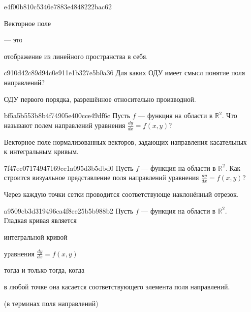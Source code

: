 \begin{note}{e4f00b810c5346e7883e4848222bac62}
    \begin{icloze}{2}Векторное поле\end{icloze} --- это \begin{icloze}{1}отображение из линейного пространства в себя.\end{icloze}
\end{note}

\begin{note}{c910d42c89d94c0e911e1b327e5b0a36}
    Для каких ОДУ имеет смысл понятие поля направлений?

    \begin{cloze}{1}
        ОДУ первого порядка, разрешённое относительно производной.
    \end{cloze}
\end{note}

\begin{note}{bf5a5b553b8b4f74905e400cce49df6c}
    Пусть \({ f }\) --- функция на области в \({ \mathbb R^2 }\).
    Что называют полем направлений уравнения \({ \frac{dy}{dx} = f(x, y) }\)?

    \begin{cloze}{1}
        Векторное поле нормализованных векторов, задающих направления касательных к интегральным кривым.
    \end{cloze}
\end{note}

\begin{note}{7f47ec07174947169cc1a095d3b5dbd0}
    Пусть \({ f }\) --- функция на области в \({ \mathbb R^2 }\).
    Как строится визуальное представление поля направлений уравнения \({ \frac{dy}{dx} = f(x, y) }\)?

    \begin{cloze}{1}
        Через каждую точки сетки проводится соответствующе наклонённый отрезок.
    \end{cloze}
\end{note}

\begin{note}{a9509cb3d319496ca4f8ce25b5b988b2}
    Пусть \({ f }\) --- функция на области в \({ \mathbb R^2 }\).
    Гладкая кривая является \begin{icloze}{2}интегральной кривой\end{icloze} уравнения \({ \frac{dy}{dx} = f(x, y) }\) \begin{icloze}{3}тогда и только тогда, когда\end{icloze}
    \begin{icloze}{1}в любой точке она касается соответствующего элемента поля направлений.\end{icloze}

    \begin{center}
        \tiny
        (в терминах поля направлений)
    \end{center}
\end{note}

